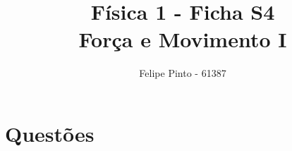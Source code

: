 \documentclass[12pt]{article}
\begin{document}
\title{\bfseries\color{DarkGreen!75!}%
	Física 1 - Ficha S4\\Força e Movimento I%
}
\author{Felipe Pinto - 61387}

\maketitle
\tableofcontents
\break

{
\bfseries\color{DarkGreen!75!}
\part{Questões}
}

\renewcommand{\thesection}{Questão \arabic{section} }
\renewcommand{\thesubsection}{%
	Q\arabic{section} - \alph{subsection})%
}

\setcounter{section}{1}

\section{}
\end{document}
